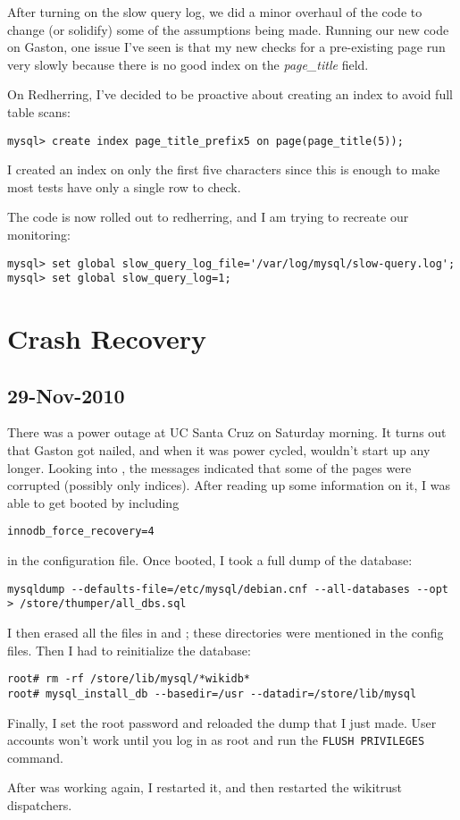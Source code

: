 After turning on the slow query log, we did a minor overhaul of
the code to change (or solidify) some of the assumptions being made.
Running our new code on Gaston, one issue I've seen is that my new
checks for a pre-existing page run very slowly because there is no good index
on the \textit{page\_title} field.

On Redherring, I've decided to be proactive about creating an index to
avoid full table scans:
\begin{verbatim}
mysql> create index page_title_prefix5 on page(page_title(5));
\end{verbatim}
I created an index on only the first five characters since this is enough
to make most tests have only a single row to check.

The code is now rolled out to redherring, and I am trying to recreate our
monitoring:
\begin{verbatim}
mysql> set global slow_query_log_file='/var/log/mysql/slow-query.log';
mysql> set global slow_query_log=1;
\end{verbatim}

\section{Crash Recovery}

\subsection{29-Nov-2010}

There was a power outage at UC Santa Cruz on Saturday morning.
It turns out that Gaston got nailed, and when it was power cycled,
\mysql wouldn't start up any longer.
Looking into , the messages indicated that some
of the pages were corrupted (possibly only indices).
After reading up some information on it, I was able to get
\mysql booted by including
\begin{verbatim}
innodb_force_recovery=4
\end{verbatim}
in the configuration file.
Once booted, I took a full dump of the database:
\begin{verbatim}
mysqldump --defaults-file=/etc/mysql/debian.cnf --all-databases --opt > /store/thumper/all_dbs.sql
\end{verbatim}

I then erased all the \mysql files in  and
; these directories were mentioned in
the config files.
Then I had to reinitialize the database:
\begin{verbatim}
root# rm -rf /store/lib/mysql/*wikidb*
root# mysql_install_db --basedir=/usr --datadir=/store/lib/mysql
\end{verbatim}

Finally, I set the root password and reloaded the dump that I just made.
User accounts won't work until you log in as root and run
the \texttt{FLUSH PRIVILEGES} command.

After \mysql was working again, I restarted it, and then
restarted the wikitrust dispatchers.

